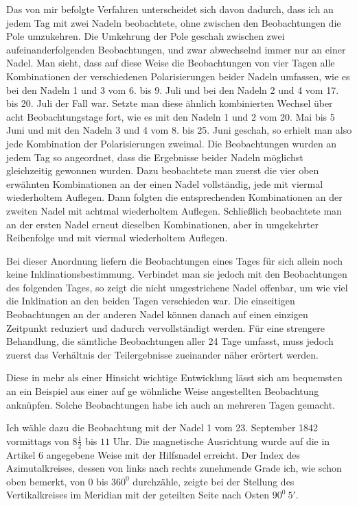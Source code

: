 Das von mir befolgte Verfahren unterscheidet sich davon dadurch, dass ich an jedem Tag mit zwei Nadeln beobachtete, ohne zwischen den Beobachtungen die Pole umzukehren. Die Umkehrung der Pole geschah zwischen zwei aufeinanderfolgenden Beobachtungen, und zwar abwechselnd immer nur an einer Nadel. Man sieht, dass auf diese Weise die Beobachtungen von vier Tagen alle Kombinationen der verschiedenen Polarisierungen beider Nadeln umfassen, wie es bei den Nadeln 1 und 3 vom 6. bis 9. Juli und bei den Nadeln 2 und 4 vom 17. bis 20. Juli der Fall war. Setzte man diese ähnlich kombinierten Wechsel über acht Beobachtungstage fort, wie es mit den Nadeln 1 und 2 vom 20. Mai bis 5 Juni und mit den Nadeln 3 und 4 vom 8. bis 25. Juni geschah, so erhielt man also jede Kombination der Polarisierungen zweimal. Die Beobachtungen wurden an jedem Tag so angeordnet, dass die Ergebnisse beider Nadeln möglichst gleichzeitig gewonnen wurden. Dazu beobachtete man zuerst die vier oben erwähnten Kombinationen an der einen Nadel vollständig, jede mit viermal wiederholtem Auflegen. Dann folgten die entsprechenden Kombinationen an der zweiten Nadel mit achtmal wiederholtem Auflegen. Schließlich beobachtete man an der ersten Nadel erneut dieselben Kombinationen, aber in umgekehrter Reihenfolge und mit viermal wiederholtem Auflegen.

Bei dieser Anordnung liefern die Beobachtungen eines Tages für sich allein noch keine Inklinationsbestimmung. Verbindet man sie jedoch mit den Beobachtungen des folgenden Tages, so zeigt die nicht umgestrichene Nadel offenbar, um wie viel die Inklination an den beiden Tagen verschieden war. Die einseitigen Beobachtungen an der anderen Nadel können danach auf einen einzigen Zeitpunkt reduziert und dadurch vervollständigt werden. Für eine strengere Behandlung, die sämtliche Beobachtungen aller 24 Tage umfasst, muss jedoch zuerst das Verhältnis der Teilergebnisse zueinander näher erörtert werden.

Diese in mehr als einer Hinsicht wichtige Entwicklung lässt sich am bequemsten an ein Beispiel aus einer auf ge%
%
wöhnliche Weise angestellten Beobachtung anknüpfen. Solche Beobachtungen habe ich auch an mehreren Tagen gemacht.

Ich wähle dazu die Beobachtung mit der Nadel 1 vom 23. September 1842 vormittags von $8\frac{1}{2}$ bis $11$ Uhr. Die magnetische Ausrichtung wurde auf die in Artikel 6 angegebene Weise mit der Hilfsnadel erreicht. Der Index des Azimutalkreises, dessen von links nach rechts zunehmende Grade ich, wie schon oben bemerkt, von $0$ bis $360^0$ durchzähle, zeigte bei der Stellung des Vertikalkreises im Meridian mit der geteilten Seite nach Osten $90^0\ 5'$.

